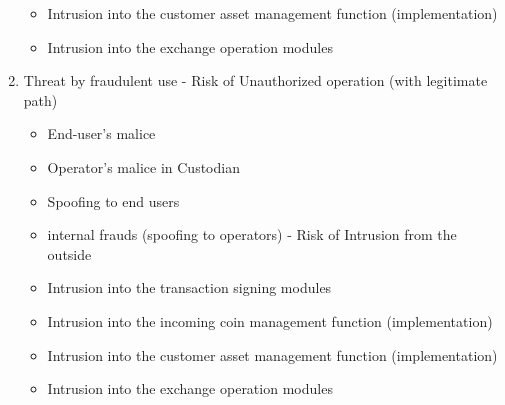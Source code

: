 \begin{enumerate}
\begin{itemize}
    \item Intrusion into the customer asset management function (implementation)

    \item Intrusion into the exchange operation modules
  \end{itemize}
  \item Threat by fraudulent use - Risk of Unauthorized operation (with legitimate path)
  \begin{itemize}
    \item End-user's malice
    \item Operator's malice in Custodian
    \item Spoofing to end users
    \item internal frauds (spoofing to operators) - Risk of Intrusion from the outside
    \item Intrusion into the transaction signing modules
    \item Intrusion into the incoming coin management function (implementation)
    \item Intrusion into the customer asset management function (implementation)
    \item Intrusion into the exchange operation modules
  \end{itemize}
\end{enumerate}

